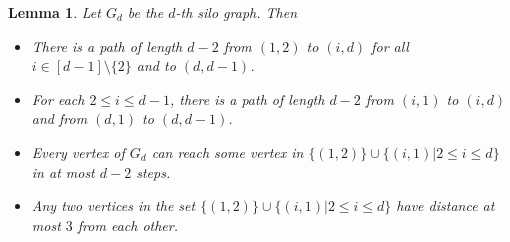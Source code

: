 \documentclass[centering,11pt,reqno]{amsart}
\newtheorem{lem}[theorem]{Lemma}
\theoremstyle{definition}
\begin{document}
\begin{lem}
\label{lem:dminus2}
Let $G_{d}$ be the $d$-th silo graph. Then 
\begin{itemize}
    \item[(a)] There is a path of length $d-2$ from $(1,2)$ to $(i,d)$ for all $i \in [d-1] \setminus \{2\}$ and to $(d,d-1)$.
    \item[(b)] For each $2 \leq i \leq d-1$, there is a path of length $d-2$ from $(i,1)$ to $(i,d)$ and from $(d,1)$ to $(d,d-1)$. 
    \item[(c)] Every vertex of $G_d$ can reach some vertex in $\{(1,2)\}\cup \{(i,1)|2\le i \le d\}$ in at most $d-2$ steps.
    \item[(d)] Any two vertices in the set $\{(1,2)\}\cup \{(i,1)|2\le i\le d\}$ have distance at most $3$ from each other.
\end{itemize}
\end{lem}
\end{document}
